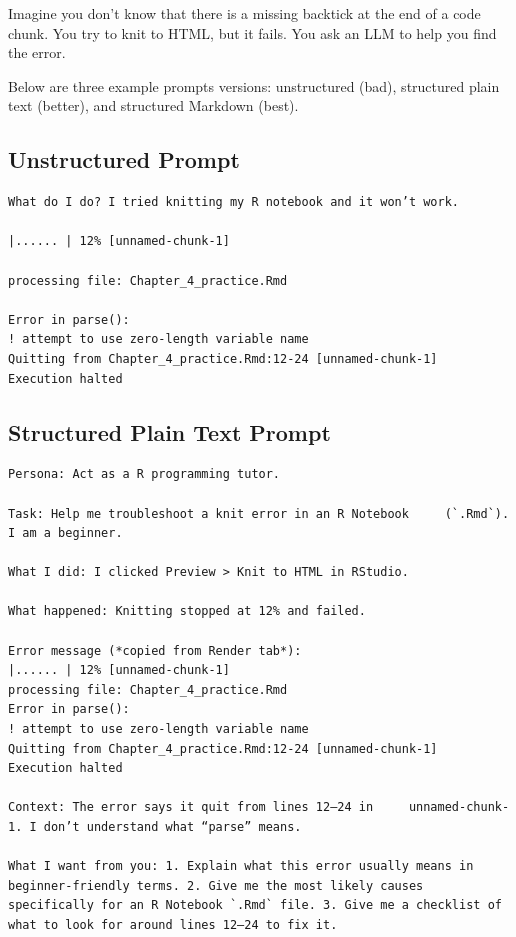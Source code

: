 \documentclass[
  12pt,
]{scrreprt}
\begin{document}
Imagine you don't know that there is a missing backtick at the end of a
code chunk. You try to knit to HTML, but it fails. You ask an LLM to
help you find the error.

Below are three example prompts versions: unstructured (bad), structured
plain text (better), and structured Markdown (best).

\subsection{Unstructured Prompt}\label{unstructured-prompt}

\begin{verbatim}
What do I do? I tried knitting my R notebook and it won’t work. 

|...... | 12% [unnamed-chunk-1]

processing file: Chapter_4_practice.Rmd

Error in parse():
! attempt to use zero-length variable name
Quitting from Chapter_4_practice.Rmd:12-24 [unnamed-chunk-1]
Execution halted
\end{verbatim}

\subsection{Structured Plain Text
Prompt}\label{structured-plain-text-prompt}

\begin{verbatim}
Persona: Act as a R programming tutor.

Task: Help me troubleshoot a knit error in an R Notebook     (`.Rmd`). I am a beginner.

What I did: I clicked Preview > Knit to HTML in RStudio.

What happened: Knitting stopped at 12% and failed.

Error message (*copied from Render tab*):
|...... | 12% [unnamed-chunk-1]
processing file: Chapter_4_practice.Rmd
Error in parse():
! attempt to use zero-length variable name
Quitting from Chapter_4_practice.Rmd:12-24 [unnamed-chunk-1]
Execution halted

Context: The error says it quit from lines 12–24 in     unnamed-chunk-1. I don’t understand what “parse” means.

What I want from you: 1. Explain what this error usually means in beginner-friendly terms. 2. Give me the most likely causes specifically for an R Notebook `.Rmd` file. 3. Give me a checklist of what to look for around lines 12–24 to fix it.
\end{verbatim}
\end{document}
